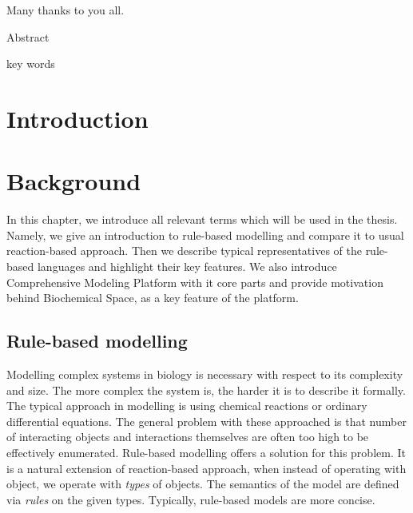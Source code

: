 \documentclass[12pt]{fithesis2}
\begin{document}
\FrontMatter
\ThesisTitlePage

\begin{ThesisDeclaration}
\DeclarationText
\AdvisorName
\end{ThesisDeclaration}

\begin{ThesisThanks}
Many thanks to you all.
\end{ThesisThanks}

\begin{ThesisAbstract}
Abstract
\end{ThesisAbstract}

\begin{ThesisKeyWords}
key words
\end{ThesisKeyWords}

\MainMatter
\tableofcontents

\chapter{Introduction}

\chapter{Background}

In this chapter, we introduce all relevant terms which will be used in the thesis. Namely, we give an introduction to rule-based modelling and compare it to usual reaction-based approach. Then we describe typical representatives of the rule-based languages and highlight their key features. We also introduce Comprehensive Modeling Platform with it core parts and provide motivation behind Biochemical Space, as a key feature of the platform.

\section{Rule-based modelling}
\label{Rule-based basics}

Modelling complex systems in biology is necessary with respect to its complexity and size. The more complex the system is, the harder it is to describe it formally. The typical approach in modelling is using chemical reactions or ordinary differential equations. The general problem with these approached is that number of interacting objects and interactions themselves are often too high to be effectively enumerated. Rule-based modelling offers a solution for this problem. It is a natural extension of reaction-based approach, when instead of operating with object, we operate with \emph{types} of objects. The semantics of the model are defined via \emph{rules} on the given types. Typically, rule-based models are more concise.
\end{document}
